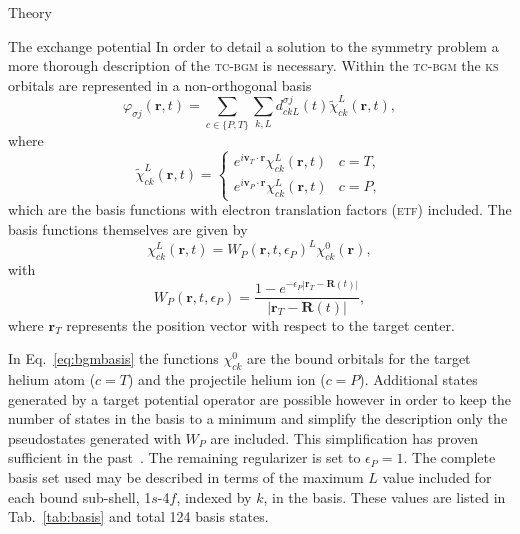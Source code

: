 \documentclass[aps, pra, reprint, groupedaddress, amsfonts, longbibliography,
               amsmath, amssymb, showpacs, nofootinbib]{revtex4-1}
\begin{document}
\begin{section}{Theory \label{sec:theory}}
\begin{subsection}{The exchange potential \label{sec:xpot}}
      In order to detail a solution to the symmetry problem a more thorough description of the
      \textsc{tc-bgm} is necessary. Within the \textsc{tc-bgm} the \textsc{ks} orbitals are
      represented in a non-orthogonal basis
      \begin{equation} \label{eq:bgmexp}
         \varphi_{\sigma j}(\mathbf{r},t) = \sum\limits_{c \in \{P, T\}} \sum\limits_{k, L}
                               d_{c k L}^{\sigma j}(t) \tilde{\chi}^{L}_{c k}(\mathbf{r},t),
      \end{equation}
      where
      \begin{equation} \label{eq:etfbasis}
         \tilde{\chi}^{L}_{ck}(\mathbf{r},t) =
            \begin{cases}
               e^{i \mathbf{v}_T \cdot \mathbf{r}} {\chi}^{L}_{c k}(\mathbf{r},t) & c = T, \\[2ex]
               e^{i \mathbf{v}_P \cdot \mathbf{r}} {\chi}^{L}_{c k}(\mathbf{r},t) & c = P,
            \end{cases}
      \end{equation}
      which are the basis functions with electron translation factors (\textsc{etf}) included. The basis
      functions themselves are given by
      \begin{equation} \label{eq:bgmbasis}
         \chi^{L}_{ck} (\mathbf{r},t)
         = W_P( \mathbf{r},t, \epsilon_P)^L \chi^{0}_{ck} (\mathbf{r}),
      \end{equation}
      with
      \begin{equation}
         W_P (\mathbf{r},t,\epsilon_P)
         = \frac{1 - e^{-\epsilon_P|\mathbf{r}_T - \mathbf{R}(t)|}}{|\mathbf{r}_T - \mathbf{R}(t)|},
      \end{equation}
      where $\mathbf{r}_T$ represents the position vector with respect to the target center.

      In Eq.~\eqref{eq:bgmbasis} the functions $\chi^{0}_{ck}$ are the bound orbitals for the target
      helium atom ($c = T$) and the projectile helium ion ($c = P$). Additional states generated by a
      target potential operator are possible however in order to keep the number of states in the basis
      to a minimum and simplify the description only the pseudostates generated with $W_P$ are included.
      This simplification has proven sufficient in the past~\cite{bgm-rev}. The remaining regularizer is
      set to $\epsilon_P = 1$. The complete basis set used may be described in terms of the maximum $L$
      value included for each bound sub-shell, 1$s$-4$f$, indexed by $k$, in the basis. These values are
      listed in Tab.~\ref{tab:basis} and total 124 basis states.


\end{subsection}
\end{section}
\end{document}
